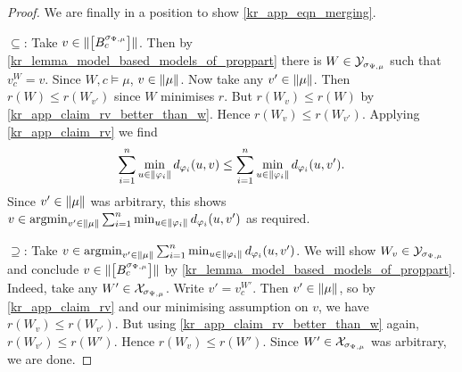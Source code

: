\begin{proof}
    We are finally in a position to show \cref{kr_app_eqn_merging}.

    $\subseteq$: Take $v \in \|{\left[{B^{\sigma_{\Psi, \mu}}_c}\right]}\|$.
    Then by \cref{kr_lemma_model_based_models_of_proppart} there is $W \in
    \mathcal{Y}_{\sigma_{\Psi, \mu}}$ such that $v^W_c = v$. Since $W, c \models \mu$,
    $v \in \|{\mu}\|$. Now take any $v' \in \|{\mu}\|$. Then $r(W)
    \le r(W_{v'})$ since $W$ minimises $r$. But $r(W_v) \le r(W)$ by
    \cref{kr_app_claim_rv_better_than_w}. Hence $r(W_v) \le r(W_{v'})$.
    Applying \cref{kr_app_claim_rv} we find
    \[
        \sum_{i=1}^{n}{
            \min_{u \in \|{\varphi_i}\|}{
                d_{\varphi_i}(u, v)
            }
        }
        \le
        \sum_{i=1}^{n}{
            \min_{u \in \|{\varphi_i}\|}{
                d_{\varphi_i}(u, v')
            }
        }.
    \]
    Since $v' \in \|{\mu}\|$ was arbitrary, this shows $v \in \argmin_{v'
    \in \propmods{\mu}}{\sum_{i=1}^{n}{\min_{u \in
    \propmods{\phi_i}}{d_{\phi_i}(u, v')}}}$ as required.

    $\supseteq$: Take $v \in \argmin_{v' \in
    \propmods{\mu}}{\sum_{i=1}^{n}{\min_{u \in \propmods{\phi_i}}{d_{\phi_i}(u,
    v')}}}$. We will show $W_v \in \mathcal{Y}_{\sigma_{\Psi, \mu}}$ and conclude $v \in
    \|{\left[{B^{\sigma_{\Psi, \mu}}_c}\right]}\|$ by
    \cref{kr_lemma_model_based_models_of_proppart}. Indeed, take any $W' \in
    \mathcal{X}_{\sigma_{\Psi, \mu}}$. Write $v' = v^{W'}_c$. Then $v' \in
    \|{\mu}\|$, so by \cref{kr_app_claim_rv} and our minimising
    assumption on $v$, we have $r(W_v) \le r(W_{v'})$. But using
    \cref{kr_app_claim_rv_better_than_w} again, $r(W_{v'}) \le r(W')$. Hence
    $r(W_v) \le r(W')$. Since $W' \in \mathcal{X}_{\sigma_{\Psi, \mu}}$ was arbitrary,
    we are done.
\end{proof}

